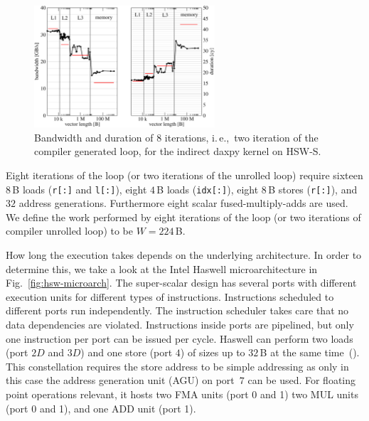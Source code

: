 \begin{figure}[t]
  \centering
  \includegraphics[width=0.60\textwidth,clip=true]{images/daxpy-indirect-bw-hasep1-f-2_3-w-cy}
   \caption{Bandwidth and duration of 8 iterations, i.\,e.,\ two iteration of the
compiler generated loop, for the indirect daxpy kernel on HSW-S.}
  \label{fig:daxpy-indirect:perf}
\end{figure}

Eight iterations of the loop (or two iterations of the unrolled loop) require
sixteen $8$\,B loads (\verb|r[:]| and
\verb|l[:]|), eight $4$\,B loads (\verb'idx[:]'), eight
$8$\,B stores (\verb'r[:]'), and $32$ address generations.
Furthermore eight scalar fused-multiply-adds are used. 
We define the work performed by eight iterations of the loop (or two iterations of compiler unrolled loop) to be $W =
224$\,B.

How long the execution takes depends on the underlying architecture. 
In order to determine this, we take a look at the Intel Haswell
microarchitecture in Fig.~\ref{fig:hsw-microarch}.
The super-scalar design has several ports with different execution units for
different types of instructions.
Instructions scheduled to different ports run independently.
The instruction scheduler takes care that no data dependencies are violated.
Instructions inside ports are pipelined, but only one instruction per port can
be issued per cycle.
Haswell can perform two loads (port $2D$ and $3D$) and one store (port $4$) of
sizes up to $32$\,B at the same time~(\cite{agner-2016-11-3}).
This constellation requires the store address to be simple addressing as only in
this case the address generation unit (AGU) on port~$7$ can be used.
%
For floating point operations relevant, it hosts two FMA units (port 0 and
1) two MUL units (port 0 and 1), and one ADD unit (port 1).

